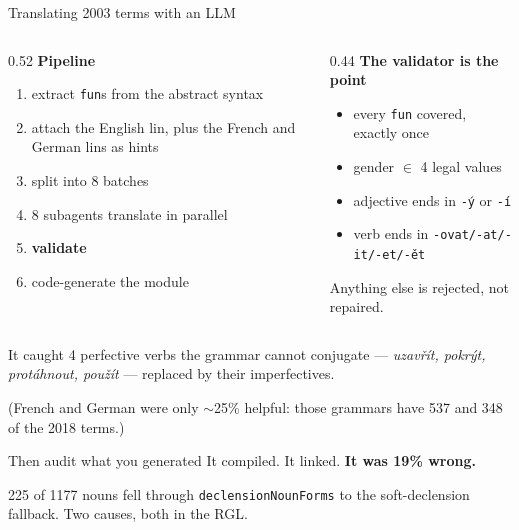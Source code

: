 \documentclass[10pt,aspectratio=169]{beamer}
\begin{document}
\begin{frame}{Translating 2003 terms with an LLM}
  \begin{columns}[T]
  \begin{column}{0.52\textwidth}
  \textbf{Pipeline}
  \begin{enumerate}\small
    \item extract \texttt{fun}s from the abstract syntax
    \item attach the English lin, plus the French and German lins as hints
    \item split into 8 batches
    \item 8 subagents translate in parallel
    \item \textbf{validate}
    \item code-generate the module
  \end{enumerate}
  \end{column}
  \begin{column}{0.44\textwidth}
  \textbf{The validator is the point}
  \begin{itemize}\small
    \item every \texttt{fun} covered, exactly once
    \item gender $\in$ 4 legal values
    \item adjective ends in \texttt{-ý} or \texttt{-í}
    \item verb ends in \texttt{-ovat/-at/-it/-et/-ět}
  \end{itemize}
  \vspace{0.5em}
  \small Anything else is \alert{rejected}, not repaired.
  \end{column}
  \end{columns}

  \vspace{1em}
  It caught 4 perfective verbs the grammar cannot conjugate ---
  \emph{uzavřít, pokrýt, protáhnout, použít} --- replaced by their imperfectives.

  \vspace{0.3em}
  \small (French and German were only $\sim$25\% helpful: those grammars have 537 and 348
  of the 2018 terms.)
\end{frame}

\begin{frame}{Then audit what you generated}
  It compiled. It linked. \textbf{It was 19\% wrong.}

  \vspace{0.5em}
  225 of 1177 nouns fell through \texttt{declensionNounForms} to the
  soft-declension fallback. Two causes, both in the RGL.
\end{frame}
\end{document}
